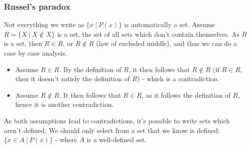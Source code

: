 \documentclass[a4paper, 12pt]{article}
\begin{document}
            \subsubsection*{Russel's paradox}
                Not everything we write as $\{x\ |\ P(x)\}$ is automatically a set. Assume $R = \{X\ |\ X \notin X\}$ is a set, the set of all sets which don't contain themselves. As $R$ is a set, then $R \in R$, or $R \notin R$ (law of excluded middle), and thus we can do a case by case analysis.
                \begin{itemize}
                    \item Assume $R \in R$. By the definition of $R$, it then follows that $R \notin R$ (if $R \in R$, then it doesn't satisfy the definition of $R$) - which is a contradiction.
                    \item Assume $R \notin R$. It then follows that $R \in R$, as it follows the definition of $R$, hence it is another contradiction.
                \end{itemize}
                As both assumptions lead to contradictions, it's possible to write sets which aren't defined. We should only select from a set that we know is defined; $\{x \in A\ |\ P(x)\}$ - where $A$ is a well-defined set.
\end{document}
